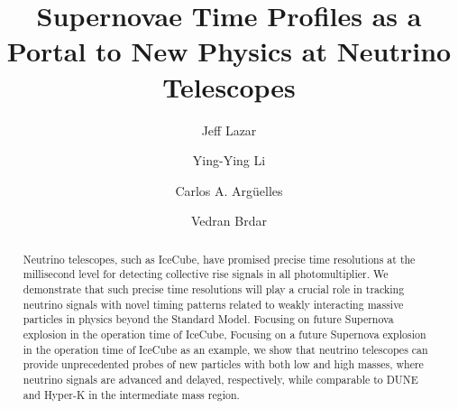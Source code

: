 
\title{
Supernovae Time Profiles as a Portal to New Physics at Neutrino Telescopes
}

\author{Jeff Lazar}
\author{Ying-Ying Li}
\author{Carlos A. Arg\"{u}elles}
\author{Vedran Brdar}


\begin{abstract}
Neutrino telescopes, such as IceCube, have promised precise time resolutions at the millisecond level for detecting collective rise signals in all photomultiplier.
We demonstrate that such precise time resolutions will play a crucial role in tracking neutrino signals with novel timing patterns related to weakly interacting massive particles in physics beyond the Standard Model.
Focusing on future Supernova explosion in the operation time of IceCube, Focusing on a future Supernova explosion in the operation time of IceCube as an example, we show that neutrino telescopes can provide unprecedented probes of new particles with both low and high masses, where neutrino signals are advanced and delayed, respectively, while comparable to DUNE and Hyper-K in the intermediate mass region.
\end{abstract}

\maketitle